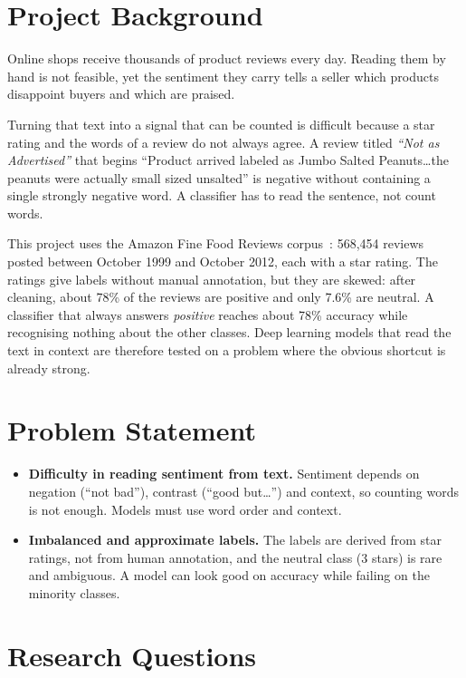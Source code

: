 \section{Project Background}
\label{sec:1-1}

Online shops receive thousands of product reviews every day. Reading them by hand is not feasible, yet the sentiment they carry tells a seller which products disappoint buyers and which are praised.

Turning that text into a signal that can be counted is difficult because a star rating and the words of a review do not always agree. A review titled \emph{``Not as Advertised''} that begins ``Product arrived labeled as Jumbo Salted Peanuts\ldots the peanuts were actually small sized unsalted'' is negative without containing a single strongly negative word. A classifier has to read the sentence, not count words.

This project uses the Amazon Fine Food Reviews corpus~\cite{mcauley2013,kaggle_fine_food}: 568{,}454 reviews posted between October 1999 and October 2012, each with a star rating. The ratings give labels without manual annotation, but they are skewed: after cleaning, about 78\% of the reviews are positive and only 7.6\% are neutral. A classifier that always answers \emph{positive} reaches about 78\% accuracy while recognising nothing about the other classes. Deep learning models that read the text in context are therefore tested on a problem where the obvious shortcut is already strong.

\section{Problem Statement}
\label{sec:1-2}

\begin{itemize}
    \item \textbf{Difficulty in reading sentiment from text.} Sentiment depends on negation (``not bad''), contrast (``good but\ldots'') and context, so counting words is not enough. Models must use word order and context.
    \item \textbf{Imbalanced and approximate labels.} The labels are derived from star ratings, not from human annotation, and the neutral class (3 stars) is rare and ambiguous. A model can look good on accuracy while failing on the minority classes.
\end{itemize}

\section{Research Questions}
\label{sec:1-3}

